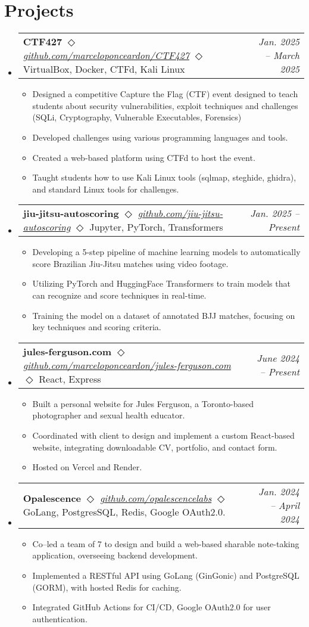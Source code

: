 \documentclass[letterpaper,11pt]{article}
\makeatletter
\newcommand{\resumeItem}[1]{
  \item\small{
    {#1 \vspace{-2pt}}
  }
}
\newcommand{\resumeProjectHeading}[2]{
    \item
    \begin{tabular*}{0.97\textwidth}{l@{\extracolsep{\fill}}r}
      \small#1 & #2 \\
    \end{tabular*}\vspace{-7pt}
}
\newcommand{\resumeSubHeadingListStart}{\begin{itemize}[leftmargin=0.15in, label={}]}
\newcommand{\resumeSubHeadingListEnd}{\end{itemize}}
\newcommand{\resumeItemListStart}{\begin{itemize}}
\newcommand{\resumeItemListEnd}{\end{itemize}\vspace{-5pt}}
\makeatother
\begin{document}
\section{Projects}
    \resumeSubHeadingListStart
      \resumeProjectHeading
      {\textbf{CTF427} $\Diamond$ \textit{\href{https://github.com/marceloponceardon/CTF427}{github.com/marceloponceardon/CTF427}} $\Diamond$ {\footnotesize VirtualBox, Docker, CTFd, Kali Linux}}{\emph{Jan. 2025 -- March 2025}}
          \resumeItemListStart
	  \resumeItem{Designed a competitive Capture the Flag (CTF) event designed to teach students about security vulnerabilities, exploit techniques and challenges (SQLi, Cryptography, Vulnerable Executables, Forensics)}
	  \resumeItem{Developed challenges using various programming languages and tools.}
	  \resumeItem{Created a web-based platform using CTFd to host the event.}
	  \resumeItem{Taught students how to use Kali Linux tools (sqlmap, steghide, ghidra), and standard Linux tools for challenges.}
          \resumeItemListEnd
      \resumeProjectHeading
      {\textbf{jiu-jitsu-autoscoring} $\Diamond$ \textit{\href{https://github.com/jiu-jitsu-autoscoring}{github.com/jiu-jitsu-autoscoring}} $\Diamond$ {\footnotesize Jupyter, PyTorch, Transformers}}{\emph{Jan. 2025 -- Present}}
          \resumeItemListStart
	  \resumeItem{Developing a 5-step pipeline of machine learning models to automatically score Brazilian Jiu-Jitsu matches using video footage.}
	  \resumeItem{Utilizing PyTorch and HuggingFace Transformers to train models that can recognize and score techniques in real-time.}
	  \resumeItem{Training the model on a dataset of annotated BJJ matches, focusing on key techniques and scoring criteria.}
          \resumeItemListEnd
      \resumeProjectHeading
      {\textbf{jules-ferguson.com} $\Diamond$ \textit{\href{https://github.com/marceloponceardon/jules-ferguson.com}{github.com/marceloponceardon/jules-ferguson.com}} $\Diamond$ {\footnotesize React, Express} }{\emph{June 2024 -- Present}}
	  \resumeItemListStart
	  \resumeItem{Built a personal website for Jules Ferguson, a Toronto-based photographer and sexual health educator.}
	  \resumeItem{Coordinated with client to design and implement a custom React-based website, integrating downloadable CV, portfolio, and contact form.}
	  \resumeItem{Hosted on Vercel and Render.}
	  \resumeItemListEnd
      \resumeProjectHeading
      {\textbf{Opalescence} $\Diamond$ \textit{\href{https://github.com/opalescencelabs}{github.com/opalescencelabs}} $\Diamond$ {\footnotesize GoLang, PostgresSQL, Redis, Google OAuth2.0.}}{\emph{Jan. 2024 -- April 2024}}
          \resumeItemListStart
	  \resumeItem{Co--led a team of 7 to design and build a web-based sharable note-taking application, overseeing backend development.}
	  \resumeItem{Implemented a RESTful API using GoLang (GinGonic) and PostgreSQL (GORM), with hosted Redis for caching.}
	  \resumeItem{Integrated GitHub Actions for CI/CD, Google OAuth2.0 for user authentication.}
          \resumeItemListEnd
    \resumeSubHeadingListEnd
\end{document}
